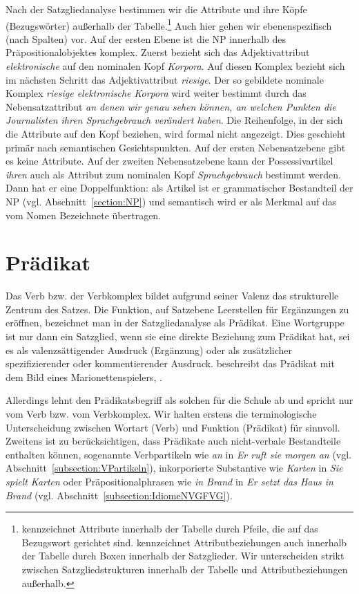 Nach der Satzgliedanalyse bestimmen wir die Attribute und ihre Köpfe (Bezugswörter) außerhalb der Tabelle.\footnote{\citet[1, 125]{Welke2007} kennzeichnet Attribute innerhalb der Tabelle durch Pfeile, die auf das Bezugswort gerichtet sind. \citet[68]{Musan2021_SGA} kennzeichnet Attributbeziehungen auch innerhalb der Tabelle durch Boxen innerhalb der Satzglieder. Wir unterscheiden strikt zwischen Satzgliedstrukturen innerhalb der Tabelle und Attributbeziehungen außerhalb.} Auch hier gehen wir ebenenspezifisch (nach Spalten) vor. Auf der ersten Ebene ist die NP innerhalb des Präpositionalobjektes komplex. Zuerst bezieht sich das Adjektivattribut \textit{elektronische} auf den nominalen Kopf \textit{Korpora}. Auf diesen Komplex bezieht sich im nächsten Schritt das Adjektivattribut \textit{riesige}. Der so gebildete nominale Komplex \textit{riesige elektronische Korpora} wird weiter bestimmt durch das Nebensatzattribut \textit{an denen wir genau sehen können, an welchen Punkten die Journalisten ihren Sprachgebrauch verändert haben}. Die Reihenfolge, in der sich die Attribute auf den Kopf beziehen, wird formal nicht angezeigt. Dies geschieht primär nach semantischen Gesichtspunkten. Auf der ersten Nebensatzebene gibt es keine Attribute. Auf der zweiten Nebensatzebene kann der Possessivartikel \textit{ihren} auch als Attribut zum nominalen Kopf \textit{Sprachgebrauch} bestimmt werden. Dann hat er eine Doppelfunktion: als Artikel ist er grammatischer Bestandteil der NP (vgl. Abschnitt~\ref{section:NP}) und semantisch wird er als Merkmal auf das vom Nomen Bezeichnete übertragen.     


\section{Prädikat}\label{subsection:komplexe Prädikate I}

Das Verb bzw. der Verbkomplex bildet aufgrund seiner Valenz das strukturelle Zentrum des Satzes. Die Funktion, auf Satzebene Leerstellen für Ergänzungen zu eröffnen, bezeichnet man in der Satzgliedanalyse als Prädikat. Eine Wortgruppe ist nur dann ein Satzglied, wenn sie eine direkte Beziehung zum Prädikat hat, sei es als valenzsättigender Ausdruck (Ergänzung) oder als zusätzlicher spezifizierender oder kommentierender Ausdruck. \citet[203]{Christ2017} beschreibt das Prädikat mit dem Bild eines Marionettenspielers, . 

Allerdings lehnt \citet[195--199]{Christ2017} den Prädikatsbegriff als solchen für die Schule ab und spricht nur vom Verb bzw. vom Verbkomplex. Wir halten erstens die terminologische Unterscheidung zwischen Wortart (Verb) und Funktion (Prädikat) für sinnvoll. Zweitens ist zu berücksichtigen, dass Prädikate auch nicht-verbale Bestandteile enthalten können, \zB sogenannte Verbpartikeln wie \textit{an} in \textit{Er ruft sie morgen an} (vgl. Abschnitt~\ref{subsection:VPartikeln}), inkorporierte Substantive wie \textit{Karten} in \textit{Sie spielt Karten} oder Präpositionalphrasen wie \textit{in Brand} in \textit{Er setzt das Haus in Brand} (vgl. Abschnitt~\ref{subsection:IdiomeNVGFVG}).
 
